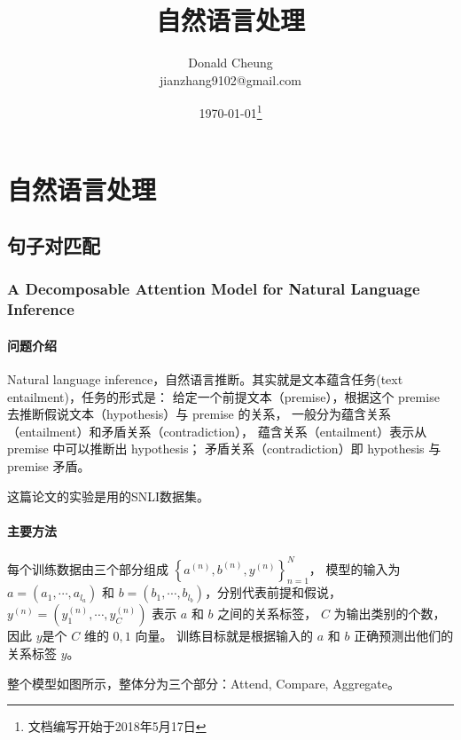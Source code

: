 \ifx\papersnotes\undefined
    \providecommand{\notesroot}{../..}
    \providecommand{\nlppapersroot}{.}

    \title{自然语言处理}
    \author{Donald Cheung\\jianzhang9102@gmail.com}
    \date{\today\footnote{文档编写开始于2018年5月17日}}

    
\else
    \providecommand{\nlppapersroot}{\papersroot/nlp}
\fi

\chapter{自然语言处理}

\section{句子对匹配}

\subsection{A Decomposable Attention Model for Natural Language Inference \cite{parikh2016decomposable}}

\subsubsection{问题介绍}
Natural language inference，自然语言推断。其实就是文本蕴含任务(text entailment)，任务的形式是：
给定一个前提文本（premise），根据这个 premise 去推断假说文本（hypothesis）与 premise 的关系，
一般分为蕴含关系（entailment）和矛盾关系（contradiction），
蕴含关系（entailment）表示从 premise 中可以推断出 hypothesis；
矛盾关系（contradiction）即 hypothesis 与 premise 矛盾。


这篇论文的实验是用的SNLI数据集。

\subsubsection{主要方法}
每个训练数据由三个部分组成 $\left\{ a^{(n)}, b^{(n)}, y^{(n)} \right\}_{n=1}^{N}$，
模型的输入为 $a = (a_{1}, \cdots, a_{l_{a}})$ 和 $b = (b_{1}, \cdots, b_{l_{b}})$，分别代表前提和假说，
$y^{(n)}=\left( y_{1}^{(n)}, \cdots, y_{C}^{(n)} \right)$ 表示 $a$ 和 $b$ 之间的关系标签，
$C$ 为输出类别的个数，因此 $y $是个 $C$ 维的 $0,1$ 向量。
训练目标就是根据输入的 $a$ 和 $b$ 正确预测出他们的关系标签 $y$。

整个模型如图所示，整体分为三个部分：Attend, Compare, Aggregate。

